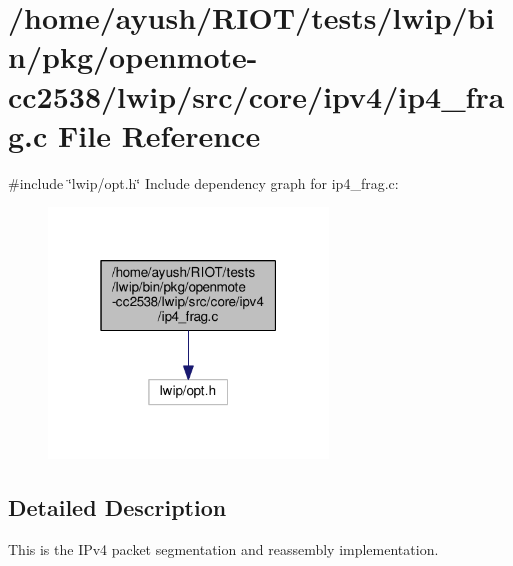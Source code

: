 \hypertarget{openmote-cc2538_2lwip_2src_2core_2ipv4_2ip4__frag_8c}{}\section{/home/ayush/\+R\+I\+O\+T/tests/lwip/bin/pkg/openmote-\/cc2538/lwip/src/core/ipv4/ip4\+\_\+frag.c File Reference}
\label{openmote-cc2538_2lwip_2src_2core_2ipv4_2ip4__frag_8c}
{\ttfamily \#include \char`\"{}lwip/opt.\+h\char`\"{}}\newline
Include dependency graph for ip4\+\_\+frag.\+c\+:
\nopagebreak
\begin{figure}[H]
\begin{center}
\leavevmode
\includegraphics[width=211pt]{openmote-cc2538_2lwip_2src_2core_2ipv4_2ip4__frag_8c__incl}
\end{center}
\end{figure}


\subsection{Detailed Description}
This is the I\+Pv4 packet segmentation and reassembly implementation. 
